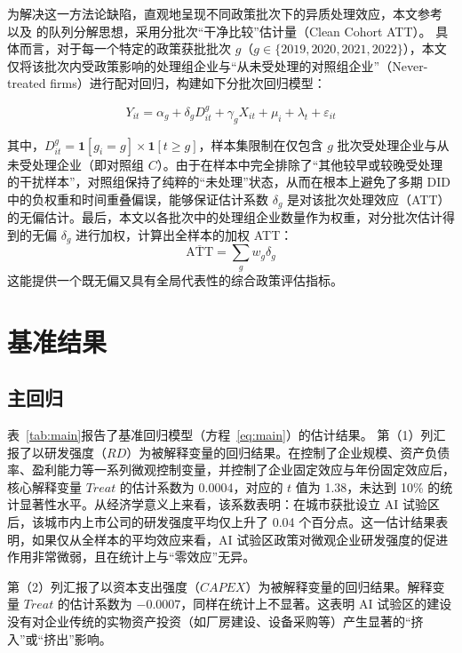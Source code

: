 \documentclass[12pt,hyperref,a4paper,UTF8]{ctexart}
\begin{document}
为解决这一方法论缺陷，直观地呈现不同政策批次下的异质处理效应，本文参考 \textcite{callaway2021difference} 以及 \textcite{sun2021estimating} 的队列分解思想，采用分批次“干净比较”估计量（Clean Cohort ATT）。
具体而言，对于每一个特定的政策获批批次 $g$（$g \in \{2019, 2020, 2021, 2022\}$），本文仅将该批次内受政策影响的处理组企业与“从未受处理的对照组企业”（Never-treated firms）进行配对回归，构建如下分批次回归模型：

\begin{equation}
Y_{it} = \alpha_g + \delta_g D_{it}^g + \gamma_g X_{it} + \mu_i + \lambda_t + \varepsilon_{it}
\label{eq:cohort}
\end{equation}

其中，$D_{it}^g = \mathbf{1}[g_i = g] \times \mathbf{1}[t \geq g]$，样本集限制在仅包含 $g$ 批次受处理企业与从未受处理企业（即对照组 $C$）。由于在样本中完全排除了“其他较早或较晚受处理的干扰样本”，对照组保持了纯粹的“未处理”状态，从而在根本上避免了多期 DID 中的负权重和时间重叠偏误，能够保证估计系数 $\delta_g$ 是对该批次处理效应（ATT）的无偏估计。最后，本文以各批次中的处理组企业数量作为权重，对分批次估计得到的无偏 $\delta_g$ 进行加权，计算出全样本的加权 ATT：
\begin{equation}
\overline{\text{ATT}} = \sum_{g} w_g \delta_g
\end{equation}
这能提供一个既无偏又具有全局代表性的综合政策评估指标。

\section{基准结果}

\subsection{主回归}

表~\ref{tab:main}报告了基准回归模型（方程~\ref{eq:main}）的估计结果。
第（1）列汇报了以研发强度（$RD$）为被解释变量的回归结果。在控制了企业规模、资产负债率、盈利能力等一系列微观控制变量，并控制了企业固定效应与年份固定效应后，核心解释变量 $Treat$ 的估计系数为 0.0004，对应的 $t$ 值为 1.38，未达到 10\% 的统计显著性水平。从经济学意义上来看，该系数表明：在城市获批设立 AI 试验区后，该城市内上市公司的研发强度平均仅上升了 0.04 个百分点。这一估计结果表明，如果仅从全样本的平均效应来看，AI 试验区政策对微观企业研发强度的促进作用非常微弱，且在统计上与“零效应”无异。

第（2）列汇报了以资本支出强度（$CAPEX$）为被解释变量的回归结果。解释变量 $Treat$ 的估计系数为 $-0.0007$，同样在统计上不显著。这表明 AI 试验区的建设没有对企业传统的实物资产投资（如厂房建设、设备采购等）产生显著的“挤入”或“挤出”影响。
\end{document}
